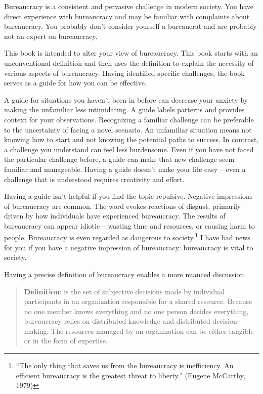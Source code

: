 

Bureaucracy is a consistent and pervasive challenge in modern society. You have direct experience with bureaucracy and may be familiar with complaints about bureaucracy. You probably don't consider yourself a bureaucrat and are probably not an expert on bureaucracy.

This book is intended to alter your view of bureaucracy. This book starts with an unconventional definition and then uses the definition to explain the necessity of various aspects of bureaucracy. Having identified specific challenges, the book serves as a guide for how you can be effective. 

A guide for situations you haven't been in before can decrease your anxiety by making the unfamiliar less intimidating. 
A guide labels patterns and provides context for your observations. 
Recognizing a familiar challenge can be preferable to the uncertainty of facing a novel scenario. An unfamiliar situation means not knowing how to start and not knowing the potential paths to success. In contrast, a challenge you understand can feel less burdensome. 
Even if you have not faced the particular challenge before, a guide can make that new challenge seem familiar and manageable. 
Having a guide doesn't make your life easy -- even a challenge that is understood requires creativity and effort.


Having a guide isn't helpful if you find the topic repulsive.
Negative impressions of bureaucracy are common. The word
evokes reactions of disgust, primarily driven by how individuals have experienced bureaucracy.
The results of bureaucracy can appear idiotic -- 
wasting time and resources, or causing harm to people.
Bureaucracy is even regarded as dangerous to society.\footnote{``The only thing that saves us from the bureaucracy is inefficiency. An efficient bureaucracy is the greatest threat to liberty." (Eugene McCarthy, 1979)}
I have bad news for you if you have a negative impression of bureaucracy: bureaucracy is vital to society. 

Having a precise definition of bureaucracy enables a more nuanced discussion. 
\begin{quote}
\textbf{Definition}: 
\iftoggle{glossarysubstitutionworks}{\Gls{bureaucracy}}{Bureaucracy}
is the set of subjective decisions made by individual participants in an organization responsible for a shared resource. Because no one member knows everything and no one person decides everything, bureaucracy relies on distributed knowledge and distributed decision-making.
The resources managed by an organization can be either tangible or in the form of expertise.  
\end{quote}

